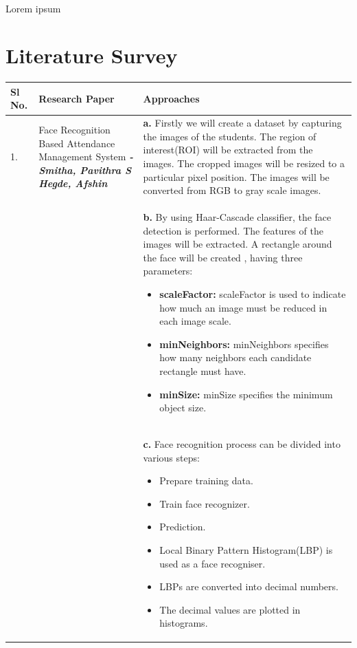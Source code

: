\documentclass[12pt,a4paper]{article}%
\begin{document}
   \paragraph{}
   \justify
	Lorem ipsum
        \pagebreak
        
        
    \section{Literature Survey}
	\begin{longtable}{|p{2cm}|p{4cm}|p{7cm}|}
	
	 
	\hline
	\textbf{Sl No.} & \textbf{Research Paper} & \textbf{Approaches}\\
	\hline
	1. & Face Recognition Based 
	Attendance Management System 
	\textit{\textbf{ - Smitha, Pavithra S Hegde, Afshin}}
	& \textbf{a.} Firstly we will create a dataset by capturing the images of the students. 
	The region of interest(ROI)  will be extracted from the images. 
	The cropped images will be resized  to a particular pixel position. 
	The images will be converted from RGB to gray scale images.
	\\
	\hline
	&  & \textbf{b.} By using Haar-Cascade classifier, the face detection is performed. The features of the images will be extracted.
	A rectangle around the face will be created , having three parameters:
	\begin{itemize}
		\item \textbf{scaleFactor:} scaleFactor is used to indicate how much an image must be reduced in each image scale.
		\item \textbf{minNeighbors:}   minNeighbors specifies how many neighbors each candidate rectangle must have.
		\item \textbf{minSize:}  minSize specifies the minimum object size.
	\end{itemize}\\
	\hline
	&  & \textbf{c.} Face recognition process can be divided into various steps:
	\begin{itemize}
		\item Prepare training data.
		\item Train face recognizer.
		\item Prediction.
		\item Local Binary Pattern Histogram(LBP) is used as a face           recogniser.
		\item LBPs are converted into decimal numbers.
		\item The decimal values are plotted in histograms.

\end{itemize}
\end{longtable}
\end{document}
